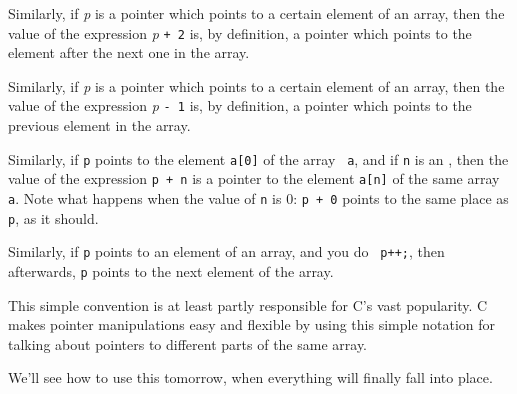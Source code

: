 Similarly, if {\em p}\/ is a pointer which points to a certain element of
an array, then the value of the expression {\em p} {\tt + 2} is, by
definition, a pointer which points to the element after the next one in
the array.  

Similarly, if {\em p}\/ is a pointer which points to a certain element of
an array, then the value of the expression {\em p} {\tt - 1} is, by
definition, a pointer which points to the previous element in the array.

Similarly, if {\tt p} points to the element {\tt a[0]} of the array {\tt
a}, and if {\tt n} is an \int, then the value of the expression {\tt p +
n} is a pointer to the element {\tt a[n]} of the same array {\tt a}.
Note what happens when the value of {\tt n} is 0:  {\tt p + 0} points to
the same place as {\tt p}, as it should.

Similarly, if {\tt p} points to an element of an array, and you do {\tt
p++;}, then afterwards, {\tt p} points to the next element of the array.

This simple convention is at least partly responsible for C's vast
popularity.  C makes pointer manipulations easy and flexible by using
this simple notation for talking about pointers to different parts of
the same array.

We'll see how to use this tomorrow, when everything will finally fall
into place.



